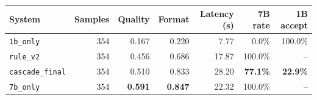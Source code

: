 \begin{tabular}{lrrrrrr}
\toprule
System & Samples & Quality & Format & Latency (s) & 7B rate & 1B accept \\
\midrule
\texttt{1b\_only} & 354 & 0.167 & 0.220 & 7.77 & 0.0\% & 100.0\% \\
\texttt{rule\_v2} & 354 & 0.456 & 0.686 & 17.87 & 100.0\% & -- \\
\rowcolor{paceTealLight}
\texttt{cascade\_final} & 354 & 0.510 & 0.833 & 28.20 & \textbf{77.1\%} & \textbf{22.9\%} \\
\texttt{7b\_only} & 354 & \textbf{0.591} & \textbf{0.847} & 22.32 & 100.0\% & -- \\
\bottomrule
\end{tabular}
